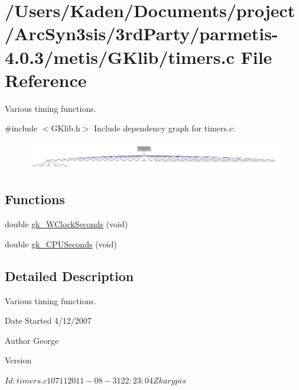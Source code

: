 \hypertarget{a00158}{}\section{/\+Users/\+Kaden/\+Documents/project/\+Arc\+Syn3sis/3rd\+Party/parmetis-\/4.0.3/metis/\+G\+Klib/timers.c File Reference}
\label{a00158}


Various timing functions.  


{\ttfamily \#include $<$G\+Klib.\+h$>$}\newline
Include dependency graph for timers.\+c\+:\nopagebreak
\begin{figure}[H]
\begin{center}
\leavevmode
\includegraphics[width=350pt]{a00159}
\end{center}
\end{figure}
\subsection*{Functions}
\begin{DoxyCompactItemize}
\item 
double \hyperlink{a00158_abc56539a50e81723bb4f80b5529708d0}{gk\+\_\+\+W\+Clock\+Seconds} (void)
\item 
double \hyperlink{a00158_a3e9b43a695411f5f0b3396083fe688d6}{gk\+\_\+\+C\+P\+U\+Seconds} (void)
\end{DoxyCompactItemize}


\subsection{Detailed Description}
Various timing functions. 

\begin{DoxyDate}{Date}
Started 4/12/2007 
\end{DoxyDate}
\begin{DoxyAuthor}{Author}
George 
\end{DoxyAuthor}
\begin{DoxyVersion}{Version}
\begin{DoxyVerb}$Id: timers.c 10711 2011-08-31 22:23:04Z karypis $ \end{DoxyVerb}
 
\end{DoxyVersion}


